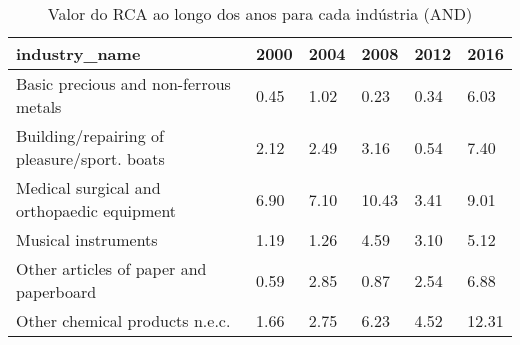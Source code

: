 \begin{table}
\centering
\caption{Valor do RCA ao longo dos anos para cada indústria (AND)}
\begin{tabular}{p{6cm}p{1.5cm}p{1.5cm}p{1.5cm}p{1.5cm}p{1.5cm}}
\toprule
                              industry\_name & 2000 & 2004 &  2008 & 2012 &  2016 \\
\midrule
      Basic precious and non-ferrous metals & 0.45 & 1.02 &  0.23 & 0.34 &  6.03 \\
Building/repairing of pleasure/sport. boats & 2.12 & 2.49 &  3.16 & 0.54 &  7.40 \\
 Medical surgical and orthopaedic equipment & 6.90 & 7.10 & 10.43 & 3.41 &  9.01 \\
                        Musical instruments & 1.19 & 1.26 &  4.59 & 3.10 &  5.12 \\
     Other articles of paper and paperboard & 0.59 & 2.85 &  0.87 & 2.54 &  6.88 \\
             Other chemical products n.e.c. & 1.66 & 2.75 &  6.23 & 4.52 & 12.31 \\
\bottomrule
\end{tabular}
\end{table}
